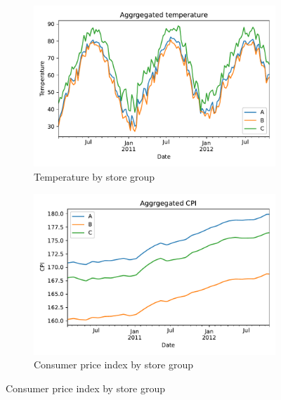 \documentclass[english, 12pt, a4paper, sci, utf8, a-1b, online]{aaltothesis}
\begin{document}
\begin{figure}
	\begin{subfigure}[b]{0.5\textwidth}
		\centering
		\includegraphics[width=\textwidth]{../plots/dataset/dataset_plot_temperature.pdf}
		\caption{Temperature by store group}
		\label{fig:data_temp}
	\end{subfigure}
	\hfill
	\begin{subfigure}[b]{0.5\textwidth}
		\centering
		\includegraphics[width=\textwidth]{../plots/dataset/dataset_plot_CPI.pdf}
		\caption{Consumer price index by store group}
		\label{fig:data_cpi}
	\end{subfigure}



\end{figure}
\end{document}
